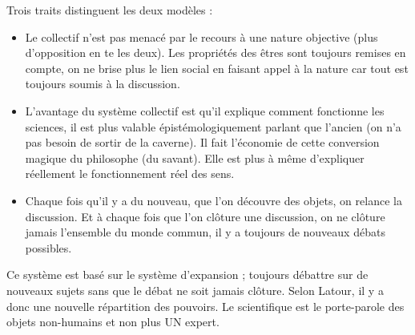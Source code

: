 \documentclass[11pt,a4paper]{article} %
\begin{document}
Trois traits distinguent les deux modèles :
\begin{itemize}
	\item Le collectif n'est pas menacé par le recours à une nature objective (plus d'opposition en te les deux).
		Les propriétés des êtres sont toujours remises en compte, on ne brise plus le lien social en faisant appel à la nature car tout est toujours soumis à la discussion.
	\item L'avantage du système collectif est qu'il explique comment fonctionne les sciences, il est plus valable épistémologiquement parlant que l'ancien (on n'a pas besoin de sortir de la caverne).
		Il fait l'économie de cette conversion magique du philosophe (du savant).
		Elle est plus à même d'expliquer réellement le fonctionnement réel des sens.
	\item Chaque fois qu'il y a du nouveau, que l'on découvre des objets, on relance la discussion.
		Et à chaque fois que l'on clôture une discussion, on ne clôture jamais l'ensemble du monde commun, il y a toujours de nouveaux débats possibles.
\end{itemize}
Ce système est basé sur le système d'expansion ; toujours débattre sur de nouveaux sujets sans que le débat ne soit jamais clôture.
Selon Latour, il y a donc une nouvelle répartition des pouvoirs.
Le scientifique est le porte-parole des objets non-humains et non plus UN expert.
\end{document}
